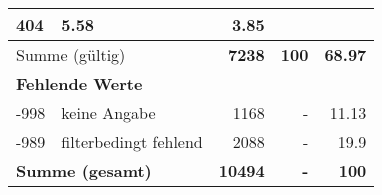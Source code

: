 \begin{longtable}{lXrrr}
       \num{404} &
       \num[round-mode=places,round-precision=2]{5,58} &
         \num[round-mode=places,round-precision=2]{3,85} \\
     \midrule
     \multicolumn{2}{l}{Summe (gültig)} &
       \textbf{\num{7238}} &
     \textbf{100} &
       \textbf{\num[round-mode=places,round-precision=2]{68,97}} \\
     \multicolumn{5}{l}{\textbf{Fehlende Werte}}\\
       -998 &
       keine Angabe &
         \num{1168} &
        - &
         \num[round-mode=places,round-precision=2]{11,13} \\
       -989 &
       filterbedingt fehlend &
         \num{2088} &
        - &
         \num[round-mode=places,round-precision=2]{19,9} \\
     \midrule
     \multicolumn{2}{l}{\textbf{Summe (gesamt)}} &
          \textbf{\num{10494}} &
        \textbf{-} &
        \textbf{100} \\
     \bottomrule
     \end{longtable}
     
